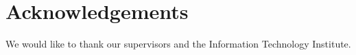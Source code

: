 \chapter*{Acknowledgements}

We would like to thank our supervisors and the Information Technology Institute.

\clearpage